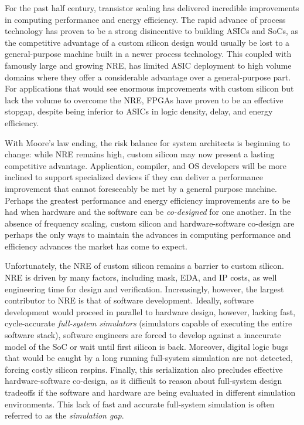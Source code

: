 For the past half century, transistor scaling has delivered incredible
improvements in computing performance and energy efficiency. The rapid advance
of process technology has proven to be a strong disincentive to building ASICs and SoCs, 
as the competitive advantage of a custom silicon design would usually be lost
to a general-purpose machine built in a newer process technology. This coupled
with famously large and growing NRE, has limited ASIC deployment to high volume
domains where they offer a considerable advantage over a general-purpose part.
For applications that would see enormous improvements with custom silicon but
lack the volume to overcome the NRE, FPGAs have proven to be an effective
stopgap, despite being inferior to ASICs in logic density, delay, and energy
efficiency.

With Moore’s law ending, the risk balance for system architects is beginning to
change: while NRE remains high, custom silicon may now present a lasting
competitive advantage.  Application, compiler, and OS developers will be more
inclined to support specialized devices if they can deliver a performance
improvement that cannot foreseeably be met by a general purpose machine.
Perhaps the greatest performance and energy efficiency improvements are to be
had when hardware and the software can be \emph{co-designed} for one another.
In the absence of frequency scaling, custom silicon and hardware-software
co-design are perhaps the only ways to maintain the advances in computing
performance and efficiency advances the market has come to expect.

Unfortunately, the NRE of custom silicon remains a barrier to custom silicon.
NRE is driven by many factors, including mask, EDA, and IP costs, as well
engineering time for design and verification. Increasingly, however, the
largest contributor to NRE is that of software development.  Ideally, software
development would proceed in parallel to hardware design, however, lacking
fast, cycle-accurate \emph{full-system simulators} (simulators capable of
executing the entire software stack), software engineers are forced to develop
against a inaccurate model of the SoC or wait until first silicon is back.
Moreover, digital logic bugs that would be caught by a long running full-system
simulation are not detected, forcing costly silicon respins.  Finally, this
serialization also precludes effective hardware-software co-design, as it
difficult to reason about full-system design tradeoffs if the software and
hardware are being evaluated in different simulation environments. This lack of
fast and accurate full-system simulation is often referred to as the
\emph{simulation gap}.

